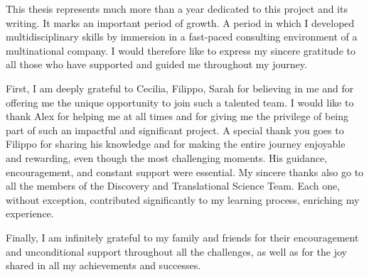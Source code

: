 ﻿%

%

\begin{ntacknowledgements}

This thesis represents much more than a year dedicated to this project and its writing. It marks an important period of growth. A period in which I developed multidisciplinary skills by immersion in a fast-paced consulting environment of a multinational company. I would therefore like to express my sincere gratitude to all those who have supported and guided me throughout my journey. 

First, I am deeply grateful to Cecilia, Filippo, Sarah for believing in me and for offering me the unique opportunity to join such a talented team. I would like to thank Alex for helping me at all times and for giving me the privilege of being part of such an impactful and significant project.
A special thank you goes to Filippo for sharing his knowledge and for making the entire journey enjoyable and rewarding, even though the most challenging moments. His guidance, encouragement, and constant support were essential. My sincere thanks also go to all the members of the Discovery and Translational Science Team. Each one, without exception, contributed significantly to my learning process, enriching my experience.

Finally, I am infinitely grateful to my family and friends for their encouragement and unconditional support throughout all the challenges, as well as for the joy shared in all my achievements and successes.

\end{ntacknowledgements}
